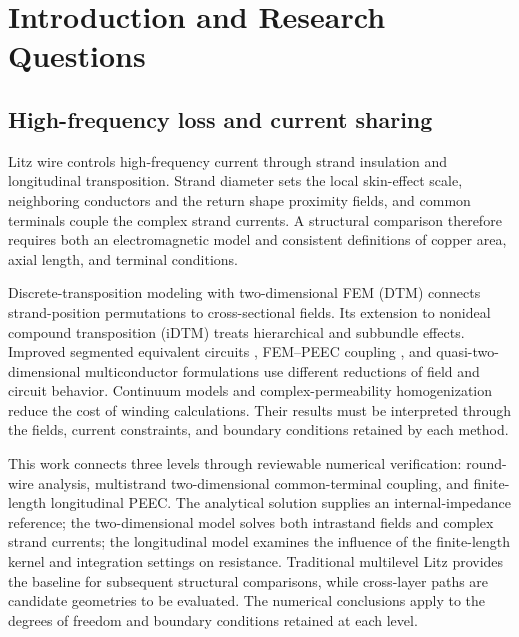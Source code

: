 \section{Introduction and Research Questions}
\label{chapter:01}

\hypertarget{01.introduction.heading}{}
\subsection{High-frequency loss and current sharing}

\hypertarget{01.introduction.p1}{}
Litz wire controls high-frequency current through strand insulation and longitudinal transposition. Strand diameter sets the local skin-effect scale, neighboring conductors and the return shape proximity fields, and common terminals couple the complex strand currents. A structural comparison therefore requires both an electromagnetic model and consistent definitions of copper area, axial length, and terminal conditions.

\hypertarget{01.introduction.p2}{}
Discrete-transposition modeling with two-dimensional FEM (DTM) \cite{P01} connects strand-position permutations to cross-sectional fields. Its extension to nonideal compound transposition (iDTM) \cite{N01} treats hierarchical and subbundle effects. Improved segmented equivalent circuits \cite{P02}, FEM–PEEC coupling \cite{P03}, and quasi-two-dimensional multiconductor formulations \cite{P04} use different reductions of field and circuit behavior. Continuum models \cite{P05} and complex-permeability homogenization \cite{P09} reduce the cost of winding calculations. Their results must be interpreted through the fields, current constraints, and boundary conditions retained by each method.

\hypertarget{01.introduction.p3}{}
This work connects three levels through reviewable numerical verification: round-wire analysis, multistrand two-dimensional common-terminal coupling, and finite-length longitudinal PEEC. The analytical solution supplies an internal-impedance reference; the two-dimensional model solves both intrastand fields and complex strand currents; the longitudinal model examines the influence of the finite-length kernel and integration settings on resistance. Traditional multilevel Litz provides the baseline for subsequent structural comparisons, while cross-layer paths are candidate geometries to be evaluated. The numerical conclusions apply to the degrees of freedom and boundary conditions retained at each level.

